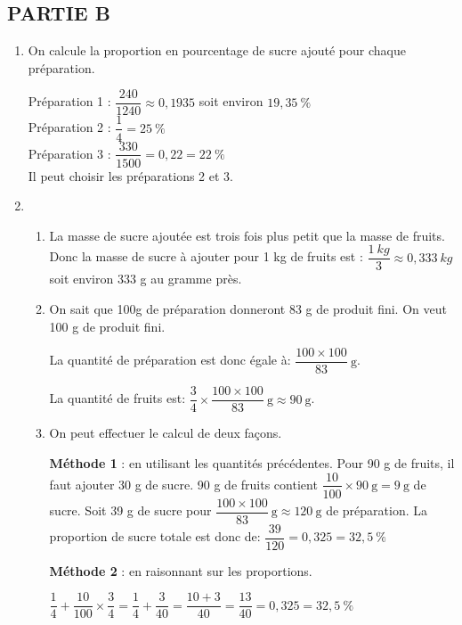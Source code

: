 \subsection*{\hspace{20mm}\textbf{PARTIE B}}
\begin{enumerate}
    \item On calcule la proportion en pourcentage de sucre ajouté pour chaque préparation.
    
    
    \begin{spacing}{2.5}
    Préparation 1 : $\dfrac{240}{1240}\approx0,1935$ soit environ $19,35~\%$\\
    Préparation 2 : $\dfrac{1}{4}=25~\%$\\
    Préparation 3 : $\dfrac{330}{1500}=0,22=22~\%$\\
    Il peut choisir les préparations 2 et 3.	
    \end{spacing}
    
    \item
    \begin{enumerate}
        \item La masse de sucre ajoutée est trois fois plus petit que la masse de fruits. Donc la masse de sucre à ajouter pour 1 kg de fruits est : $\dfrac{1~kg}{3}\approx0,333~kg$ soit environ 333 g au gramme près.
        \item On sait que 100g de préparation donneront 83 g de produit fini. On veut 100 g de produit fini. 
        
        \medskip
        La quantité de préparation est donc égale à: $\dfrac{100\times100}{83}~\text{g}$. 
        
        \medskip
        La quantité de fruits est: $\dfrac{3}{4}\times\dfrac{100\times100}{83}~\text{g}\approx90~\text{g}$.
        
        \item On peut effectuer le calcul de deux façons.
        
        \textbf{Méthode 1} : en utilisant les quantités précédentes. Pour 90 g de fruits, il faut ajouter 30 g de sucre. 90 g de fruits contient $\dfrac{10}{100}\times90~\text{g}=9~\text{g}$ de sucre. Soit 39 g de sucre pour $\dfrac{100\times100}{83}~\text{g}\approx120~\text{g}$ de préparation. La proportion de sucre totale est donc de: $\dfrac{39}{120}=0,325=32,5~\%$
        
        \bigskip
        \textbf{Méthode 2} : en raisonnant sur les proportions.
        
        \medskip
        $\dfrac{1}{4}+\dfrac{10}{100}\times\dfrac{3}{4}=\dfrac{1}{4}+\dfrac{3}{40}=\dfrac{10+3}{40}=\dfrac{13}{40}=0,325=32,5~\%$
    \end{enumerate}
\end{enumerate}
